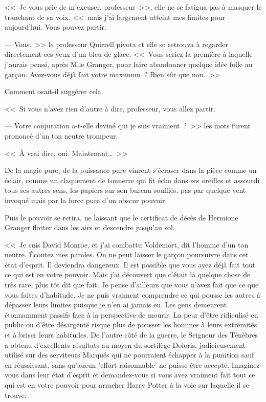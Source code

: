 <<~Je vous prie de m'excuser, professeur~>>, elle ne se fatigua pas à masquer le tranchant de sa voix, <<~mais j'ai largement atteint mes limites pour aujourd'hui. Vous pouvez partir.

--- Vous.~>> le professeur Quirrell pivota et elle se retrouva à regarder directement ces yeux d'un bleu de glace. <<~Vous seriez la première à laquelle j'aurais pensé, après Mlle Granger, pour faire abandonner quelque idée folle au garçon. Avez-vous déjà fait votre maximum~? Bien sûr que non.~>>

Comment osait-il suggérer cela.

<<~Si vous n'avez rien d'autre à dire, professeur, vous allez partir.

--- Votre conjuration a-t-elle deviné qui je suis vraiment~?~>> les mots furent prononcé d'un ton neutre trompeur.

<<~À vrai dire, oui. Maintenant…~>>

De la magie pure, de la puissance pure vinrent s'écraser dans la pièce comme un éclair, comme un claquement de tonnerre qui fit écho dans ses oreilles et assourdi tous ses autres sens, les papiers sur son bureau soufflés, pas par quelque vent invoqué mais par la force pure d'un obscur pouvoir.

Puis le pouvoir se retira, ne laissant que le certificat de décès de Hermione Granger flotter dans les airs et descendre jusqu'au sol.

<<~Je suis David Monroe, et j'ai combattu Voldemort, dit l'homme d'un ton neutre. Écoutez mes paroles. On ne peut laisser le garçon poursuivre dans cet état d'esprit. Il deviendra dangereux. Il est possible que vous ayez déjà fait tout ce qui est en votre pouvoir. Mais j'ai découvert que c'était là quelque chose de très rare, plus tôt dit que fait. Je pense d'ailleurs que vous n'avez fait que ce que vous faites d'habitude. Je ne puis vraiment comprendre ce qui pousse les autres à dépasser leurs limites puisque je n'en ai jamais eu. Les gens demeurent étonnamment passifs face à la perspective de mourir. La peur d'être ridiculisé en public ou d'être désargenté risque plus de pousser les hommes à leurs extrémités et à briser leurs habitudes. De l'autre côté de la guerre, le Seigneur des Ténèbres a obtenu d'excellents résultats au moyen du sortilège Doloris, judicieusement utilisé sur des serviteurs Marqués qui ne pourraient échapper à la punition sauf en réussissant, sans qu'aucun 'effort raisonnable' ne puisse être accepté. Imaginez-vous dans leur état d'esprit et demandez-vous si vous avez vraiment fait tout ce qui est en votre pouvoir pour arracher Harry Potter à la voie sur laquelle il se trouve.

